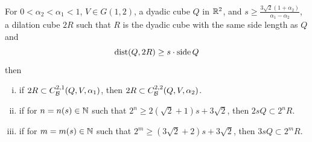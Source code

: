 \begin{lemma}
    For $0<\alpha_2<\alpha_1<1$, $V\in G(1, 2)$, a dyadic cube $Q$ in $\mathbb{R}^2$, and $s\geq \frac{3\sqrt{2}(1+\alpha_2)}{\alpha_1-\alpha_2}$, a dilation cube $2R$ such that $R$ is the dyadic cube with the same side length as $Q$ and
    \begin{equation*}
        \operatorname{dist}(Q, 2R)\geq s\cdot \operatorname{side} Q
    \end{equation*}
    then
    \begin{enumerate}[(i)]
        \item  {\color{red} if $2R\subset C_\mathcal B^{2,1}(Q, V, \alpha_1)$, then $2R\subset  C_\mathcal B^{2,2}(Q, V, \alpha_2)$.}
        \item  if for $n = n(s) \in \mathbb{N}$ such that $2^n\geq 2(\sqrt{2}+1)s + 3\sqrt{2}$, then $2sQ\subset 2^n R $.
        \item if for $m = m(s) \in \mathbb{N}$ such that $2^m \geq (3\sqrt{2}+2)s + 3\sqrt{2}$, then $3sQ\subset 2^m R$. 
    \end{enumerate}
\end{lemma}
